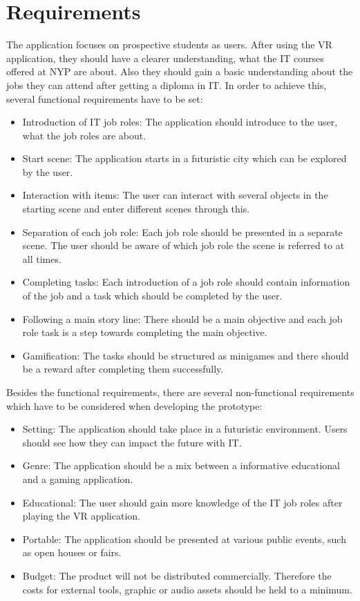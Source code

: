 \section{Requirements}
The application focuses on prospective students as users. After using the VR application, they should have a clearer understanding, what the IT courses offered at NYP are about. Also they should gain a basic understanding about the jobs they can attend after getting a diploma in IT. In order to achieve this, several functional requirements have to be set:\\
\begin{itemize}
\item Introduction of IT job roles: The application should introduce to the user, what the job roles are about.
\item Start scene: The application starts in a futuristic city which can be explored by the user.
\item Interaction with items: The user can interact with several objects in the starting scene and enter different scenes through this.
\item Separation of each job role: Each job role should be presented in a separate scene. The user should be aware of which job role the scene is referred to at all times.
\item Completing tasks: Each introduction of a job role should contain information of the job and a task which should be completed by the user.
\item Following a main story line: There should be a main objective and each job role task is a step towards completing the main objective.
\item Gamification: The tasks should be structured as minigames and there should be a reward after completing them successfully.

\end{itemize}
Besides the functional requirements, there are several non-functional requirements which have to be considered when developing the prototype:
\begin{itemize}
\item Setting: The application should take place in a futuristic environment. Users should see how they can impact the future with IT.
\item Genre: The application should be a mix between a informative educational and a gaming application.
\item Educational: The user should gain more knowledge of the IT job roles after playing the VR application.
\item Portable: The application should be presented at various public events, such as open houses or fairs.
\item Budget: The product will not be distributed commercially. Therefore the costs for external tools, graphic or audio assets should be held to a minimum.
\end{itemize}

